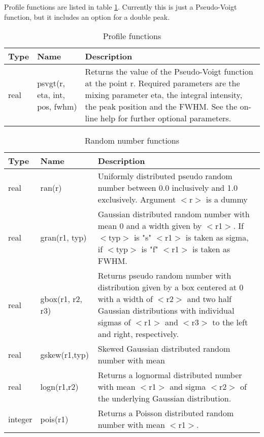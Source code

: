 Profile functions are listed in table \ref{func-profile}. Currently this is just
a Pseudo-Voigt function, but it includes an option for a double peak.

\begin{table}[!tbh]
\centering
\begin{tabularx}{\textwidth}{|p{12mm}|p{30mm}|X|}
  \hline
  {\bf Type} & {\bf Name} & {\bf Description} \\
  \hline\hline
  real & psvgt(r, eta, int, pos, fwhm) &  Returns the value of the Pseudo-Voigt function
                     at the point r. Required parameters are the mixing parameter
                     eta, the integral intensity, the peak position and the FWHM.
                     See the on-line help for further optional parameters.  \\
  \hline
\end{tabularx}
\caption{\label{func-profile}Profile functions}
\end{table}


\begin{table}[!tbh]
\centering
\begin{tabularx}{\textwidth}{|p{12mm}|p{30mm}|X|}
  \hline
  {\bf Type} & {\bf Name} & {\bf Description} \\
  \hline\hline
  real & ran(r) &         Uniformly distributed pseudo random number
                          between 0.0 inclusively and 1.0 exclusively.
                          Argument $<$r$>$ is a dummy\\
  real & gran(r1, typ) &   Gaussian distributed random number with mean
                          0 and a width given by $<$r1$>$. If $<$typ$>$
                          is "s" $<$r1$>$ is taken as sigma, if
                          $<$typ$>$ is "f" $<$r1$>$ is taken as
                          FWHM. \\
  real & gbox(r1, r2, r3) & Returns pseudo random number with
                          distribution given by a box centered
                          at 0 with a width of $<$r2$>$ and two half
                          Gaussian distributions with individual
                          sigmas of $<$r1$>$ and $<$r3$>$ to the left
                          and right, respectively. \\
  real & gskew(r1,typ) &  Skewed Gaussian distributed random number 
                          with mean
                          \\
  real & logn(r1,r2)      & Returns a lognormal distributed number
                          with mean $<$r1$>$ and sigma $<$r2$>$ of
                          the underlying
                          Gaussian distribution.\\
  integer & pois(r1)      & Returns a Poisson distributed random
                          number with mean $<$r1$>$.\\
  \hline
\end{tabularx}
\caption{\label{func-ran}Random number functions}
\end{table}

